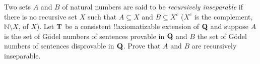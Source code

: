 \documentclass[../../../include/open-logic-section]{subfiles}
\begin{document}
\begin{prob} 
 Two sets $A$ and $B$ of natural numbers are said to be \emph{recursively 
 inseparable} if there is no recursive set $X$ such that
 $A \subseteq X$ and $B \subseteq X^c$ ($X^c$ is the complement, $\mathbb
 N \setminus X$, of $X$). Let $\mathbf{T}$ be a consistent !!{axiomatizable} 
 extension of $\mathbf{Q}$ and suppose $A$ is the set of Gödel
 numbers of sentences provable in $\mathbf{Q}$ and $B$ the set of Gödel numbers
 of sentences disprovable in $\mathbf{Q}$. Prove that $A$ and $B$ are recursively
 inseparable. 
\end{prob}
\end{document}
